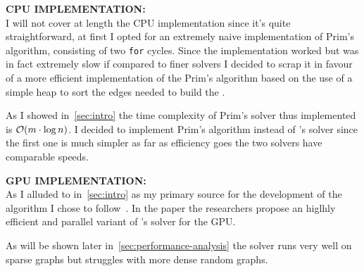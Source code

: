 \documentclass[a4paper,10pt]{article}
\begin{document}
\bigskip
{}
\makeatletter{}\makeatother\label{sec:cpu-implementation}
\noindent
\textbf{CPU IMPLEMENTATION:}
\\
I will not cover at length the CPU implementation since it's quite straightforward, at first I opted
for an extremely naive implementation of Prim's algorithm, consisting of two \texttt{for} cycles.
Since the implementation worked but was in fact extremely slow if compared to finer solvers I
decided to scrap it in favour of a more efficient implementation of the Prim's algorithm based on
the use of a simple heap to sort the edges needed to build the \mst.

As I showed in~\ref{sec:intro} the time complexity of Prim's solver thus implemented is $\mathcal{O}(m \cdot
\log{n})$. I decided to implement Prim's algorithm instead of \brka's solver since the first one is
much simpler as far as efficiency goes the two solvers have comparable speeds.

\bigskip
{}
\makeatletter\def\@currentlabel{\texttt{(IV)}}\makeatother\label{sec:gpu-implementation}
\noindent
\textbf{GPU IMPLEMENTATION:}
\\
As I alluded to in~\ref{sec:intro} as my primary source for the development of the algorithm I chose to follow~\cite{generic-he-boruvka}. In the paper the researchers propose an higlhly efficient and parallel variant of \brka's solver for the GPU.

As will be shown later in~\ref{sec:performance-analysis} the solver runs very well on sparse graphs but struggles with more dense random graphs.
\end{document}
